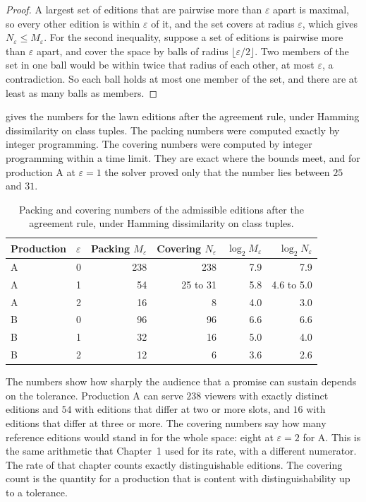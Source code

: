 \documentclass[11pt,twoside,openright]{book}
\theoremstyle{plain}
\theoremstyle{definition}
\theoremstyle{remark}
\begin{document}
\begin{proof}
A largest set of editions that are pairwise more than $\varepsilon$ apart is maximal, so every other edition is within $\varepsilon$ of it, and the set covers at radius $\varepsilon$, which gives $N_\varepsilon\le M_\varepsilon$. For the second inequality, suppose a set of editions is pairwise more than $\varepsilon$ apart, and cover the space by balls of radius $\lfloor\varepsilon/2\rfloor$. Two members of the set in one ball would be within twice that radius of each other, at most $\varepsilon$, a contradiction. So each ball holds at most one member of the set, and there are at least as many balls as members.
\end{proof}

 gives the numbers for the lawn editions after the agreement rule, under Hamming dissimilarity on class tuples. The packing numbers were computed exactly by integer programming. The covering numbers were computed by integer programming within a time limit. They are exact where the bounds meet, and for production A at $\varepsilon=1$ the solver proved only that the number lies between $25$ and $31$.

\begin{table}[ht]
\centering
\begin{tabular}{@{}llrrrr@{}}
\toprule
Production & $\varepsilon$ & Packing $M_\varepsilon$ & Covering $N_\varepsilon$ & $\log_2 M_\varepsilon$ & $\log_2 N_\varepsilon$\\
\midrule
A & 0 & 238 & 238 & 7.9 & 7.9\\
A & 1 & 54 & 25 to 31 & 5.8 & 4.6 to 5.0\\
A & 2 & 16 & 8 & 4.0 & 3.0\\
B & 0 & 96 & 96 & 6.6 & 6.6\\
B & 1 & 32 & 16 & 5.0 & 4.0\\
B & 2 & 12 & 6 & 3.6 & 2.6\\
\bottomrule
\end{tabular}
\caption{Packing and covering numbers of the admissible editions after the agreement rule, under Hamming dissimilarity on class tuples.}\label{tab:packcover}
\end{table}

The numbers show how sharply the audience that a promise can sustain depends on the tolerance. Production A can serve $238$ viewers with exactly distinct editions and $54$ with editions that differ at two or more slots, and $16$ with editions that differ at three or more. The covering numbers say how many reference editions would stand in for the whole space: eight at $\varepsilon=2$ for A. This is the same arithmetic that Chapter~1 used for its rate, with a different numerator. The rate of that chapter counts exactly distinguishable editions. The covering count is the quantity for a production that is content with distinguishability up to a tolerance.
\end{document}
